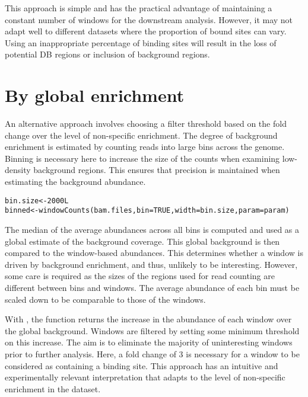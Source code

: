 \documentclass{report}\usepackage[]{graphicx}\usepackage[usenames,dvipsnames]{color}
\newcommand{\hlnum}[1]{\textcolor[rgb]{0.816,0.125,0.439}{#1}}%
\newcommand{\hlstd}[1]{\textcolor[rgb]{0.251,0.251,0.251}{#1}}%
\newcommand{\hlkwb}[1]{\textcolor[rgb]{0,0,0}{#1}}%
\newcommand{\hlkwc}[1]{\textcolor[rgb]{0.251,0.251,0.251}{#1}}%
\newcommand{\hlkwd}[1]{\textcolor[rgb]{0.878,0.439,0.125}{#1}}%
\newenvironment{knitrout}{}{} %
\begin{document}
This approach is simple and has the practical advantage of maintaining a constant number of windows for the downstream analysis. 
However, it may not adapt well to different datasets where the proportion of bound sites can vary.
Using an inappropriate percentage of binding sites will result in the loss of potential DB regions or inclusion of background regions.

\section{By global enrichment}
\label{sec:global_filter}
An alternative approach involves choosing a filter threshold based on the fold change over the level of non-specific enrichment.
The degree of background enrichment is estimated by counting reads into large bins across the genome.
Binning is necessary here to increase the size of the counts when examining low-density background regions. 
This ensures that precision is maintained when estimating the background abundance.

\begin{knitrout}
\color{fgcolor}\begin{kframe}
\begin{alltt}
\hlstd{bin.size} \hlkwb{<-} \hlnum{2000L}
\hlstd{binned} \hlkwb{<-} \hlkwd{windowCounts}\hlstd{(bam.files,} \hlkwc{bin}\hlstd{=}\hlnum{TRUE}\hlstd{,} \hlkwc{width}\hlstd{=bin.size,} \hlkwc{param}\hlstd{=param)}
\end{alltt}
\end{kframe}
\end{knitrout}

The median of the average abundances across all bins is computed and used as a global estimate of the background coverage.
This global background is then compared to the window-based abundances.
This determines whether a window is driven by background enrichment, and thus, unlikely to be interesting.
However, some care is required as the sizes of the regions used for read counting are different between bins and windows.
The average abundance of each bin must be scaled down to be comparable to those of the windows.

With , the  function returns the increase in the abundance of each window over the global background.
Windows are filtered by setting some minimum threshold on this increase.
The aim is to eliminate the majority of uninteresting windows prior to further analysis.
Here, a fold change of 3 is necessary for a window to be considered as containing a binding site. 
This approach has an intuitive and experimentally relevant interpretation that adapts to the level of non-specific enrichment in the dataset. 
\end{document}
